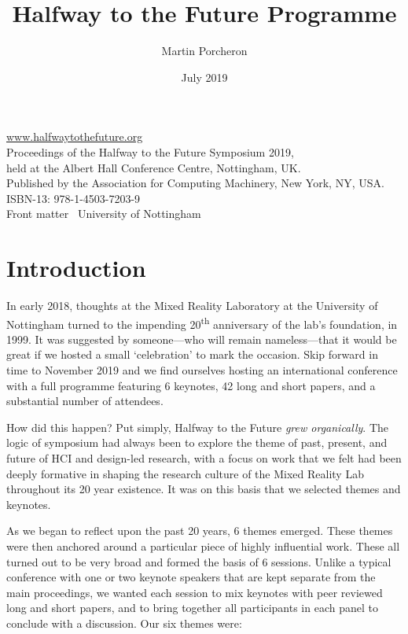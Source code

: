 \documentclass[a4paper,oneside]{memoir}
\title{Halfway to the Future Programme}
\author{Martin Porcheron}
\date{July 2019}
\begin{document}
\frontmatter


\thispagestyle{empty}
\vspace*{\fill}
\begin{raggedright}
    \href{https://www.halfwaytothefuture.org/}{www.halfwaytothefuture.org}\\[.5cm]
    Proceedings of the Halfway to the Future Symposium 2019,\\held at the Albert Hall Conference Centre, Nottingham, UK.\\[.5cm]
    Published by the Association for Computing Machinery, New York, NY, USA.\\
    ISBN-13: 978-1-4503-7203-9\\[.5cm]
    Front matter \textcopyright~University of Nottingham
\end{raggedright}
\clearpage

\mainmatter
\pagestyle{plain}


\chapter{Introduction}
In early 2018, thoughts at the Mixed Reality Laboratory at the University of Nottingham turned to the impending 20\textsuperscript{th} anniversary of the lab's foundation, in 1999. It was suggested by someone---who will remain nameless---that it would be great if we hosted a small `celebration' to mark the occasion. Skip forward in time to November 2019 and we find ourselves hosting an international conference with a full programme featuring 6 keynotes, 42 long and short papers, and a substantial number of attendees. 

How did this happen? Put simply, Halfway to the Future \textit{grew organically}. The logic of symposium had always been to explore the theme of past, present, and future of HCI and design-led research, with a focus on work that we felt had been deeply formative in shaping the research culture of the Mixed Reality Lab throughout its 20 year existence. It was on this basis that we selected themes and keynotes.

As we began to reflect upon the past 20 years, 6 themes emerged. These themes were then anchored around a particular piece of highly influential work. These all turned out to be very broad and formed the basis of 6 sessions. Unlike a typical conference with one or two keynote speakers that are kept separate from the main proceedings, we wanted each session to mix keynotes with peer reviewed long and short papers, and to bring together all participants in each panel to conclude with a discussion. Our six themes were:
\end{document}
